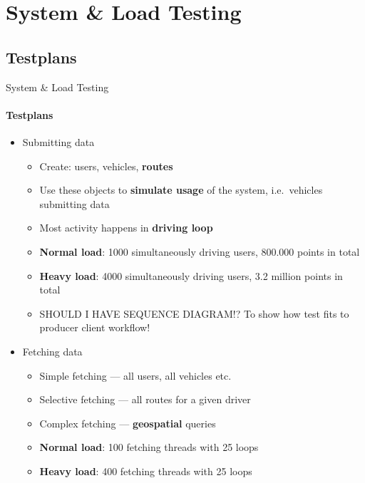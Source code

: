 \section{System \& Load Testing}
\subsection{Testplans}

\begin{frame}{System \& Load Testing}
        \framesubtitle{Testplans}
        \begin{itemize}
            \item<1-> Submitting data
                \begin{itemize}
                    \item Create: users, vehicles, \textbf{routes}
                    \item Use these objects to \textbf{simulate usage} of the system, i.e.~vehicles submitting data
                    \item Most activity happens in \textbf{driving loop}
                    \item \textbf{Normal load}: 1000 simultaneously driving users, 800.000 points in total
                    \item \textbf{Heavy load}: 4000 simultaneously driving users, 3.2 million points in total
                    \item SHOULD I HAVE SEQUENCE DIAGRAM!? To show how test fits to producer client workflow!
                \end{itemize}
            \item<2-> Fetching data
                \begin{itemize}
                    \item Simple fetching --- all users, all vehicles etc.
                    \item Selective fetching --- all routes for a given driver
                    \item Complex fetching --- \textbf{geospatial} queries
                    \item \textbf{Normal load}: 100 fetching threads with 25 loops
                    \item \textbf{Heavy load}: 400 fetching threads with 25 loops
                \end{itemize}
        \end{itemize}
\end{frame}
